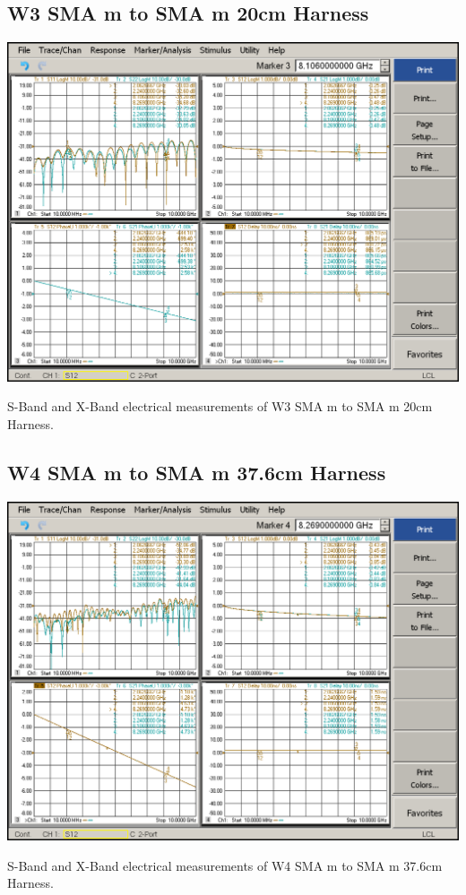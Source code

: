 \subsection{W3 SMA m to SMA m 20cm Harness}

\begin{table}[H]
	\centering
	\includegraphics[width=0.8\linewidth]{figuras/measures/W3_10M_10G}
	\caption{S-Band and X-Band electrical measurements of W3 SMA m to SMA m 20cm Harness.}
	\label{fig:W3}
\end{table}

\subsection{W4 SMA m to SMA m 37.6cm Harness}

\begin{table}[H]
	\centering
	\includegraphics[width=0.8\linewidth]{figuras/measures/W4_10M_10G}
	\caption{S-Band and X-Band electrical measurements of W4 SMA m to SMA m 37.6cm Harness.}
	\label{fig:W4}
\end{table}

